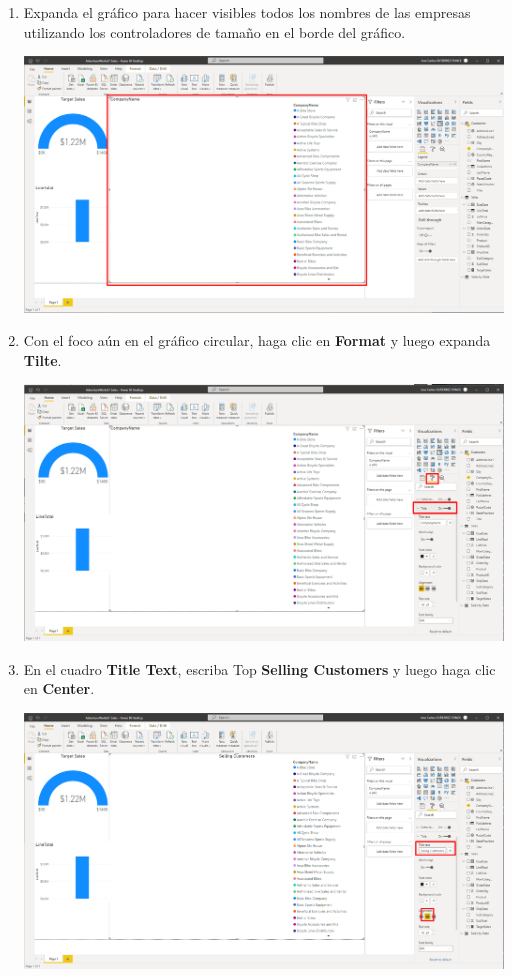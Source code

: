 \documentclass[12pt,letterpaper]{article}
\newcommand\tab[1][1cm]{\hspace*{#1}}
\begin{document}
\begin{enumerate}[\tab 1.]
\begin{center}
        \end{center}
        \item Expanda el gráfico para hacer visibles todos los nombres de las empresas utilizando los controladores de tamaño en el borde del gráfico.
        \begin{center}
            \includegraphics[width=13cm]{./img/img86.png}
        \end{center}
        \item Con el foco aún en el gráfico circular, haga clic en \textbf{Format} y luego expanda \textbf{Tilte}.
        \begin{center}
            \includegraphics[width=13cm]{./img/img87.png}
        \end{center}
        \item En el cuadro \textbf{Title Text}, escriba Top \textbf{Selling Customers} y luego haga clic en \textbf{Center}.
        \begin{center}
            \includegraphics[width=13cm]{./img/img88.png}

\end{center}
\end{enumerate}
\end{document}

